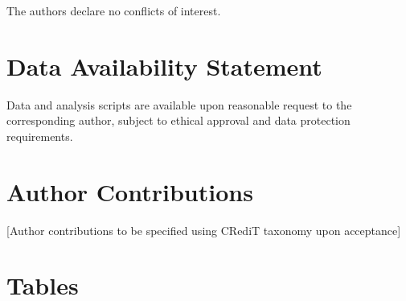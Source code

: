 \documentclass[12pt,a4paper]{article}
\begin{document}
The authors declare no conflicts of interest.

\section{Data Availability Statement}

Data and analysis scripts are available upon reasonable request to the corresponding author, subject to ethical approval and data protection requirements.

\section{Author Contributions}

[Author contributions to be specified using CRediT taxonomy upon acceptance]

\newpage




\newpage

\section{Tables}
\end{document}
